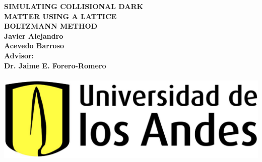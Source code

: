 
\begin{titlepage}
   \begin{center}
      \Large\textbf{SIMULATING COLLISIONAL DARK}\\
      \vspace{-4mm}\Large\textbf{MATTER USING A LATTICE}\\
      \vspace{-4mm}\Large\textbf{BOLTZMANN METHOD}\\
\vspace{15mm}
      \Large\textbf{Javier Alejandro}\\
      \vspace{-5mm}\Large\textbf{Acevedo Barroso}\\
\vspace{11mm}      
      \Large\textbf{Advisor:}\\
      \vspace{-5mm}\Large\textbf{Dr. Jaime E. Forero-Romero}\\
\vspace{15mm}      
     \Large{}\\
\vspace{8mm}           
      {\includegraphics[scale=0.11]{imag/logoUniandes.png}}\\
\vspace{3mm}           
      \Large{}\\
      \vspace{-4mm}\Large{}\\
      \vspace{-4mm}\Large{}\\
      \vspace{-4mm}\Large{}\\
      \vspace{-1mm}\Large{}
   \end{center}
\end{titlepage}

